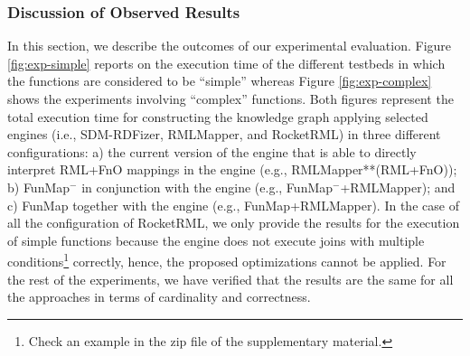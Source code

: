\subsubsection{Discussion of Observed Results}
In this section, we describe the outcomes of our experimental evaluation. Figure \ref{fig:exp-simple} reports on the execution time of the different testbeds in which the functions are considered to be ``simple'' whereas Figure \ref{fig:exp-complex} shows the experiments involving ``complex'' functions. Both figures represent the total execution time for constructing the knowledge graph applying selected engines (i.e., SDM-RDFizer, RMLMapper, and RocketRML) in three different configurations: a) the current version of the engine that is able to directly interpret RML+FnO mappings in the engine (e.g., RMLMapper**(RML+FnO)); b) FunMap$^-$ in conjunction with the engine (e.g., FunMap$^-$+RMLMapper); and c) FunMap together with the engine (e.g., FunMap+RMLMapper). In the case of all the configuration of RocketRML, we only provide the results for the execution of simple functions because the engine does not execute joins with multiple conditions\footnote{Check an example in the zip file of the supplementary material.} correctly, hence, the proposed optimizations cannot be applied. For the rest of the experiments, we have verified that the results are the same for all the approaches in terms of cardinality and correctness. 
